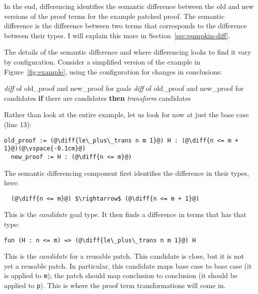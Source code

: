 In the end, differencing identifies the semantic difference between the old and new versions of the proof terms for the example patched proof.
The semantic difference is the difference between two terms that corresponds to the difference between their types.
I will explain this more in Section~\ref{sec:pumpkin-diff}.

The details of the semantic difference and where differencing looks to find it vary by configuration.
Consider a simplified version of the example in Figure~\ref{fig:example}, using the configuration for changes in conclusions:

\begin{algorithm}
\footnotesize
\begin{algorithmic}[1]
    \STATE \textit{diff}  of old\_proof and new\_proof for goals
    \STATE \textit{diff}  of old\_proof and new\_proof for candidates
    \STATE \textbf{if} there are candidates \textbf{then}
    \STATE \hspace*{1em} \textit{transform} candidates
\end{algorithmic}
\end{algorithm}
Rather than look at the entire example, let us look for now at just the base case (line 13):

\begin{lstlisting}[language=coq]
  old_proof := (@\diff{le\_plus\_trans n m 1}@) H : (@\diff{n <= m + 1}@)(@\vspace{-0.1cm}@)
  new_proof := H : (@\diff{n <= m}@)
\end{lstlisting}
The semantic differencing component first identifies the difference in their types, here:

\begin{lstlisting}
  (@\diff{n <= m}@) $\rightarrow$ (@\diff{n <= m + 1}@)
\end{lstlisting}
This is the \textit{candidate} goal type.
It then finds a difference in terms that has that type:

\begin{lstlisting}[language=coq]
  fun (H : n <= m) => (@\diff{le\_plus\_trans n m 1}@) H
\end{lstlisting}
This is the \emph{candidate} for a reusable patch.
This candidate is close, but it is not yet a reusable patch. In particular, this candidate
maps base case to base case (it is applied to \lstinline{m}); the patch should map conclusion to conclusion (it should
be applied to \lstinline{p}).
This is where the proof term transformations will come in.

